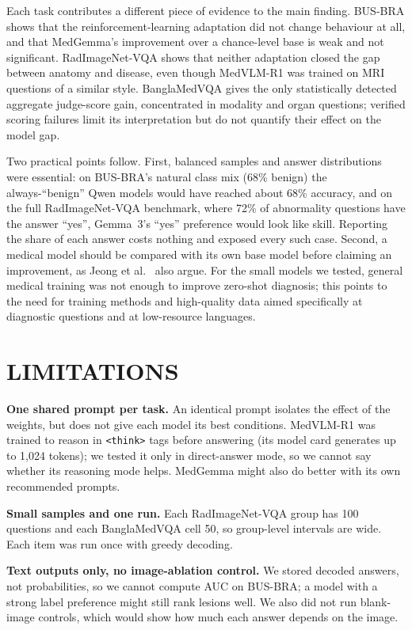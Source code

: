 \documentclass[doublecolumn]{ijcvsplatex}
\newcommand{\medvlm}{MedVLM-R1}
\newcommand{\gemma}{Gemma~3}
\newcommand{\medgemma}{MedGemma}
\begin{document}
Each task contributes a different piece of evidence to the main finding. BUS-BRA shows that the reinforcement-learning adaptation did not change behaviour at all, and that \medgemma{}'s improvement over a chance-level base is weak and not significant. RadImageNet-VQA shows that neither adaptation closed the gap between anatomy and disease, even though \medvlm{} was trained on MRI questions of a similar style. BanglaMedVQA gives the only statistically detected aggregate judge-score gain, concentrated in modality and organ questions; verified scoring failures limit its interpretation but do not quantify their effect on the model gap.

Two practical points follow. First, balanced samples and answer distributions were essential: on BUS-BRA's natural class mix (68\% benign) the always-``benign'' Qwen models would have reached about 68\% accuracy, and on the full RadImageNet-VQA benchmark, where 72\% of abnormality questions have the answer ``yes'', \gemma{}'s ``yes'' preference would look like skill. Reporting the share of each answer costs nothing and exposed every such case. Second, a medical model should be compared with its own base model before claiming an improvement, as Jeong et al.~\cite{jeong2024medadapt} also argue. For the small models we tested, general medical training was not enough to improve zero-shot diagnosis; this points to the need for training methods and high-quality data aimed specifically at diagnostic questions and at low-resource languages.

\section{LIMITATIONS}
\label{sec_limitations}

\textbf{One shared prompt per task.} An identical prompt isolates the effect of the weights, but does not give each model its best conditions. \medvlm{} was trained to reason in \texttt{<think>} tags before answering (its model card generates up to 1,024 tokens); we tested it only in direct-answer mode, so we cannot say whether its reasoning mode helps. \medgemma{} might also do better with its own recommended prompts.

\textbf{Small samples and one run.} Each RadImageNet-VQA group has 100 questions and each BanglaMedVQA cell 50, so group-level intervals are wide. Each item was run once with greedy decoding.

\textbf{Text outputs only, no image-ablation control.} We stored decoded answers, not probabilities, so we cannot compute AUC on BUS-BRA; a model with a strong label preference might still rank lesions well. We also did not run blank-image controls, which would show how much each answer depends on the image.
\end{document}
